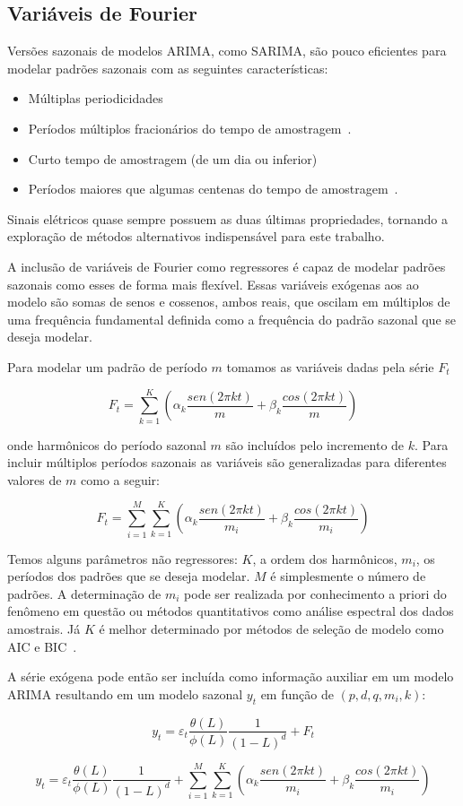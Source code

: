 \subsection{Variáveis de Fourier}

Versões sazonais de modelos ARIMA, como SARIMA, são pouco eficientes para
modelar padrões sazonais com as seguintes características:

\begin{itemize}
    \item Múltiplas periodicidades~\cite{athana}
    \item Períodos múltiplos fracionários do tempo de amostragem~\cite{hyndman_weekly}.
    \item Curto tempo de amostragem (de um dia ou inferior)~\cite{athana}
    \item Períodos maiores que algumas centenas do tempo de
    amostragem~\cite{hyndman_long_season}.
\end{itemize}

Sinais elétricos quase sempre possuem as duas últimas propriedades, tornando a
exploração de métodos alternativos indispensável para este trabalho.

A inclusão de variáveis de Fourier como regressores é capaz de modelar
padrões sazonais como esses de forma mais flexível. Essas variáveis exógenas
aos ao modelo são somas de senos e cossenos, ambos reais, que oscilam em
múltiplos de uma frequência fundamental definida como a frequência do padrão
sazonal que se deseja modelar.

Para modelar um padrão de período $m$ tomamos as variáveis dadas pela série
$F_t$

$$ F_t = \sum^K_{k=1} \left(\alpha_k \frac{sen(2\pi k t)}{m} + \beta_k\frac{cos(2\pi k t)}{m}\right) $$

onde harmônicos do período sazonal $m$ são incluídos pelo incremento de $k$.
Para incluir múltiplos períodos sazonais as variáveis são generalizadas para
diferentes valores de $m$ como a seguir:

$$ F_t = \sum^M_{i=1}\sum^K_{k=1} \left(\alpha_k \frac{sen(2\pi k t)}{m_i} + \beta_k\frac{cos(2\pi k t)}{m_i}\right) $$

Temos alguns parâmetros não regressores: $K$, a ordem dos harmônicos, $m_i$, os
períodos dos padrões que se deseja modelar. $M$ é simplesmente o número de
padrões. A determinação de $m_i$ pode ser realizada por conhecimento a priori
do fenômeno em questão ou métodos quantitativos como análise espectral dos
dados amostrais. Já $K$ é melhor determinado por métodos de seleção de modelo
como AIC e BIC~\cite{aic}.

A série exógena pode então ser incluída como informação auxiliar em um modelo
ARIMA resultando em um modelo sazonal $y_t$ em função de $(p, d, q, m_i, k)$:

$$ y_t = \varepsilon_t \frac{\theta(L)}{\phi(L)} \frac{1}{(1-L)^d} + F_t $$

$$ y_t = \varepsilon_t \frac{\theta(L)}{\phi(L)} \frac{1}{(1-L)^d} + \sum^M_{i=1}\sum^K_{k=1} \left(\alpha_k \frac{sen(2\pi k t)}{m_i} + \beta_k\frac{cos(2\pi k t)}{m_i}\right) $$
